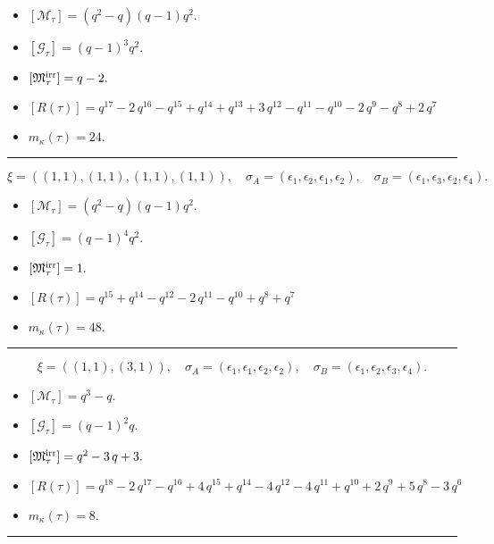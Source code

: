 \documentclass[10pt,a4paper]{amsart}
\begin{document}
\begin{itemize}
 \item $[\mathcal{M}_{\tau}] = {\left(q^{2} - q\right)} {\left(q - 1\right)} q^{2} .$

 \item $[\mathcal{G}_{\tau}] = {\left(q - 1\right)}^{3} q^{2} .$

 \item $[{\frak M}_{\tau}^{\textrm{irr}}] = q - 2 .$

 \item $[R(\tau)] = q^{17} - 2 \, q^{16} - q^{15} + q^{14} + q^{13} + 3 \, q^{12} - q^{11} - q^{10} - 2 \, q^{9} - q^{8} + 2 \, q^{7} $

 \item $m_{\kappa}(\tau) = 24 .$

 \end{itemize}
\noindent\rule{8cm}{0.4pt}

$$\xi = ({(1, 1), (1, 1)}, {(1, 1)}, {(1, 1)}),\quad \sigma_A = ({{\epsilon_1}, {\epsilon_2}}, {{\epsilon_1}}, {{\epsilon_2}}),\quad \sigma_B = ({{\epsilon_1}, {\epsilon_3}}, {{\epsilon_2}}, {{\epsilon_4}}).$$

\begin{itemize}
 \item $[\mathcal{M}_{\tau}] = {\left(q^{2} - q\right)} {\left(q - 1\right)} q^{2} .$

 \item $[\mathcal{G}_{\tau}] = {\left(q - 1\right)}^{4} q^{2} .$

 \item $[{\frak M}_{\tau}^{\textrm{irr}}] = 1 .$

 \item $[R(\tau)] = q^{15} + q^{14} - q^{12} - 2 \, q^{11} - q^{10} + q^{8} + q^{7} $

 \item $m_{\kappa}(\tau) = 48 .$

 \end{itemize}
\noindent\rule{8cm}{0.4pt}

$$\xi = ({(1, 1)}, {(3, 1)}),\quad \sigma_A = ({{\epsilon_1}}, {{\epsilon_1, \epsilon_2, \epsilon_2}}),\quad \sigma_B = ({{\epsilon_1}}, {{\epsilon_2, \epsilon_3, \epsilon_4}}).$$

\begin{itemize}
 \item $[\mathcal{M}_{\tau}] = q^{3} - q .$

 \item $[\mathcal{G}_{\tau}] = {\left(q - 1\right)}^{2} q .$

 \item $[{\frak M}_{\tau}^{\textrm{irr}}] = q^{2} - 3 \, q + 3 .$

 \item $[R(\tau)] = q^{18} - 2 \, q^{17} - q^{16} + 4 \, q^{15} + q^{14} - 4 \, q^{12} - 4 \, q^{11} + q^{10} + 2 \, q^{9} + 5 \, q^{8} - 3 \, q^{6} $

 \item $m_{\kappa}(\tau) = 8 .$

 \end{itemize}
\noindent\rule{8cm}{0.4pt}
\end{document}
